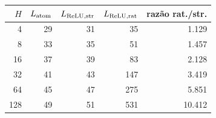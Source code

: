 \begin{tabular}{rrrrr}
\toprule
$H$ & $L_{\rm atom}$ & $L_{\rm ReLU,str}$ & $L_{\rm ReLU,rat}$ & razão rat./str.\\
\midrule
4 & 29 & 31 & 35 & 1.129\\
8 & 33 & 35 & 51 & 1.457\\
16 & 37 & 39 & 83 & 2.128\\
32 & 41 & 43 & 147 & 3.419\\
64 & 45 & 47 & 275 & 5.851\\
128 & 49 & 51 & 531 & 10.412\\
\bottomrule
\end{tabular}
